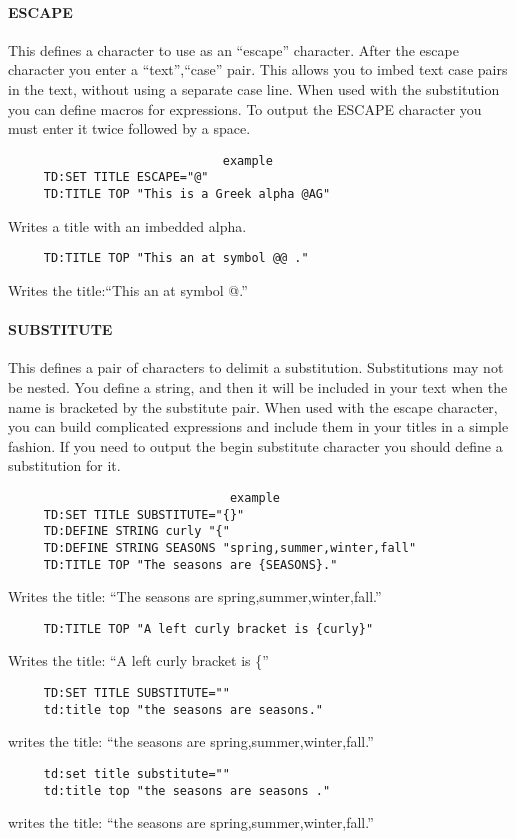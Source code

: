 \paragraph{ESCAPE}
This  defines a character to use as an ``escape'' character.  After the
escape character you enter a ``text'',``case'' pair.  This allows you  to
imbed  text  case  pairs  in  the text, without using a separate case
line.  When used with the substitution  you  can  define  macros  for
expressions.   To output the ESCAPE character you must enter it twice
followed by a space.  
\begin{verbatim}
                              example 
     TD:SET TITLE ESCAPE="@" 
     TD:TITLE TOP "This is a Greek alpha @AG" 
\end{verbatim}
Writes a title with an imbedded alpha.  
\begin{verbatim}
     TD:TITLE TOP "This an at symbol @@ ." 
\end{verbatim}
Writes the title:``This an at symbol @.'' 
\paragraph{SUBSTITUTE}
This  defines  a  pair  of  characters  to  delimit  a  substitution.
Substitutions may not be nested.  You define a string,  and  then  it
will  be  included  in  your  text  when the name is bracketed by the
substitute pair.  When used with the escape character, you can  build
complicated  expressions  and include them in your titles in a simple
fashion.  If you need to output the begin  substitute  character  you
should define a substitution for it.  
\begin{verbatim}
                               example
     TD:SET TITLE SUBSTITUTE="{}" 
     TD:DEFINE STRING curly "{" 
     TD:DEFINE STRING SEASONS "spring,summer,winter,fall" 
     TD:TITLE TOP "The seasons are {SEASONS}." 
\end{verbatim}
Writes the title:  
``The seasons are spring,summer,winter,fall.'' 
\begin{verbatim}
     TD:TITLE TOP "A left curly bracket is {curly}" 
\end{verbatim}
Writes the title:  
``A left curly bracket is \{'' 
\begin{verbatim}
     TD:SET TITLE SUBSTITUTE="" 
     td:title top "the seasons are seasons." 
\end{verbatim}
writes the title:  
``the seasons are spring,summer,winter,fall.'' 
\begin{verbatim}
     td:set title substitute="" 
     td:title top "the seasons are seasons ." 
\end{verbatim}
writes the title:  
``the seasons are spring,summer,winter,fall.'' 
